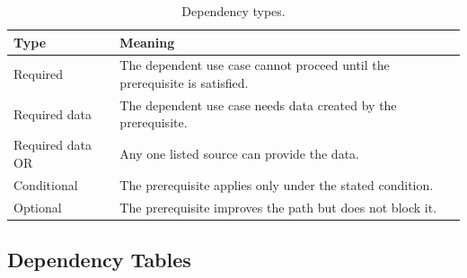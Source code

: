 \documentclass[11pt,a4paper]{article}
\begin{document}
\begin{table}[H]
    \centering
    \small
    \caption{Dependency types.}
    \begin{tabularx}{\textwidth}{@{}L{4.2cm}Y@{}}
        \toprule
        Type & Meaning\\
        \midrule
        Required & The dependent use case cannot proceed until the prerequisite is satisfied.\\
        Required data & The dependent use case needs data created by the prerequisite.\\
        Required data OR & Any one listed source can provide the data.\\
        Conditional & The prerequisite applies only under the stated condition.\\
        Optional & The prerequisite improves the path but does not block it.\\
        \bottomrule
    \end{tabularx}
    \label{tabdependencytypes}
\end{table}

\subsection{Dependency Tables}
\end{document}
